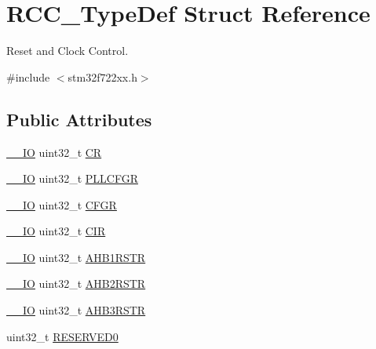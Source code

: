 \hypertarget{struct_r_c_c___type_def}{}\section{R\+C\+C\+\_\+\+Type\+Def Struct Reference}
\label{struct_r_c_c___type_def}


Reset and Clock Control.  




{\ttfamily \#include $<$stm32f722xx.\+h$>$}

\subsection*{Public Attributes}
\begin{DoxyCompactItemize}
\item 
\mbox{\hyperlink{core__sc300_8h_aec43007d9998a0a0e01faede4133d6be}{\+\_\+\+\_\+\+IO}} uint32\+\_\+t \mbox{\hyperlink{struct_r_c_c___type_def_abcb9ff48b9afb990283fefad0554b5b3}{CR}}
\item 
\mbox{\hyperlink{core__sc300_8h_aec43007d9998a0a0e01faede4133d6be}{\+\_\+\+\_\+\+IO}} uint32\+\_\+t \mbox{\hyperlink{struct_r_c_c___type_def_a2a7ccb4e23cb05a574f243f6278b7b26}{P\+L\+L\+C\+F\+GR}}
\item 
\mbox{\hyperlink{core__sc300_8h_aec43007d9998a0a0e01faede4133d6be}{\+\_\+\+\_\+\+IO}} uint32\+\_\+t \mbox{\hyperlink{struct_r_c_c___type_def_a0721b1b729c313211126709559fad371}{C\+F\+GR}}
\item 
\mbox{\hyperlink{core__sc300_8h_aec43007d9998a0a0e01faede4133d6be}{\+\_\+\+\_\+\+IO}} uint32\+\_\+t \mbox{\hyperlink{struct_r_c_c___type_def_aeadf3a69dd5795db4638f71938704ff0}{C\+IR}}
\item 
\mbox{\hyperlink{core__sc300_8h_aec43007d9998a0a0e01faede4133d6be}{\+\_\+\+\_\+\+IO}} uint32\+\_\+t \mbox{\hyperlink{struct_r_c_c___type_def_ad6abf71a348744aa3f2b7e8b214c1ca4}{A\+H\+B1\+R\+S\+TR}}
\item 
\mbox{\hyperlink{core__sc300_8h_aec43007d9998a0a0e01faede4133d6be}{\+\_\+\+\_\+\+IO}} uint32\+\_\+t \mbox{\hyperlink{struct_r_c_c___type_def_a343e0230ded55920ff2a04fbde0e5bcd}{A\+H\+B2\+R\+S\+TR}}
\item 
\mbox{\hyperlink{core__sc300_8h_aec43007d9998a0a0e01faede4133d6be}{\+\_\+\+\_\+\+IO}} uint32\+\_\+t \mbox{\hyperlink{struct_r_c_c___type_def_a39a90d838fbd0b8515f03e4a1be6374f}{A\+H\+B3\+R\+S\+TR}}
\item 
uint32\+\_\+t \mbox{\hyperlink{struct_r_c_c___type_def_a646631532167f3386763a2d10a881a04}{R\+E\+S\+E\+R\+V\+E\+D0}}

\end{DoxyCompactItemize}
